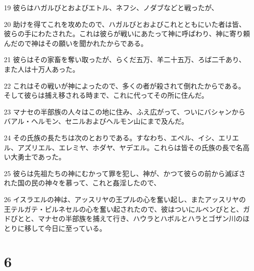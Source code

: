 \par 19 彼らはハガルびとおよびエトル、ネフシ、ノダブなどと戦ったが、
\par 20 助けを得てこれを攻めたので、ハガルびとおよびこれとともにいた者は皆、彼らの手にわたされた。これは彼らが戦いにあたって神に呼ばわり、神に寄り頼んだので神はその願いを聞かれたからである。
\par 21 彼らはその家畜を奪い取ったが、らくだ五万、羊二十五万、ろば二千あり、また人は十万人あった。
\par 22 これはその戦いが神によったので、多くの者が殺されて倒れたからである。そして彼らは捕え移される時まで、これに代ってその所に住んだ。
\par 23 マナセの半部族の人々はこの地に住み、ふえ広がって、ついにバシャンからバアル・ヘルモン、セニルおよびヘルモン山にまで及んだ。
\par 24 その氏族の長たちは次のとおりである。すなわち、エペル、イシ、エリエル、アズリエル、エレミヤ、ホダヤ、ヤデエル。これらは皆その氏族の長で名高い大勇士であった。
\par 25 彼らは先祖たちの神にむかって罪を犯し、神が、かつて彼らの前から滅ぼされた国の民の神々を慕って、これと姦淫したので、
\par 26 イスラエルの神は、アッスリヤの王プルの心を奮い起し、またアッスリヤの王テルガテ・ピルネセルの心を奮い起されたので、彼はついにルベンびとと、ガドびとと、マナセの半部族を捕えて行き、ハウラとハボルとハラとゴザン川のほとりに移して今日に至っている。

\chapter{6}


